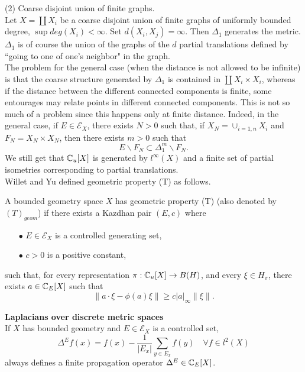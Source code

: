 (2) Coarse disjoint union of finite graphs.\\

Let $X=\coprod X_i$ be a coarse disjoint union of finite graphs of uniformly bounded degree, $\sup deg(X_i)<\infty$. Set $d(X_i, X_j)=\infty$. Then $\Delta_1$ generates the metric. $\Delta_1$ is of course the union of the graphs of the $d$ partial translations defined by ``going to one of one's neighbor" in the graph.\\

The problem for the general case (when the distance is not allowed to be infinite) is that the coarse structure generated by $\Delta_1$ is contained in $\coprod X_i \times X_i$, whereas if the distance between the different connected components is finite, some entourages may relate points in different connected components. This is not so much of a problem since this happens only at finite distance. Indeed, in the general case, if $E\in \mathcal E_X$, there exists $N>0$ such that, if $X_N = \cup_{i=1,n} X_i$ and $F_N = X_N\times X_N$, then there exists $m>0$ such that
\[E \backslash F_N \subset \Delta_1^m \backslash F_N.\] 
We still get that $\mathbb C_u[X]$ is generated by $l^\infty (X)$ and a finite set of partial isometries corresponding to partial translations.\\
	
Willet and Yu defined geometric property (T) as follows.

\begin{definition}
A bounded geometry space $X$ has geometric property (T) (also denoted by $(T)_{geom}$) if there exists a Kazdhan pair $(E,c)$ where 
\begin{itemize}
\item[$\bullet$] $E\in \mathcal E_X$ is a controlled generating set,
\item[$\bullet$] $c>0$ is a positive constant,
\end{itemize}
such that, for every representation $\pi: \mathbb C_u[X] \rightarrow B(H)$, and every $\xi \in H_\pi$, there exists $a\in \mathbb C_E[X]$ such that 
\[\|a\cdot \xi - \phi(a)\xi \| \geq c |a|_\infty \|\xi \|.\] 
\end{definition}

\textbf{Laplacians over discrete metric spaces}\\

If $X$ has bounded geometry and $E\in \mathcal E_X$ is a controlled set, 
\[\Delta^Ef(x) = f(x) -\frac{1}{|E_x|} \sum_{y\in E_x} f(y) \quad \forall f\in l^2(X) \]
always defines a finite propagation operator $\Delta^E \in \mathbb C_E[X]$.\\

